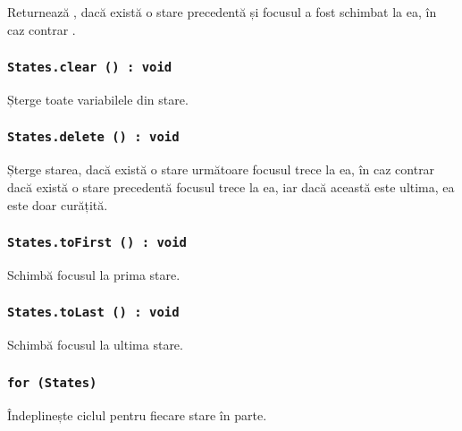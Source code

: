 Returnează \true, dacă există o stare precedentă și focusul a fost schimbat la ea, în caz contrar \false.

\subsubsection{\texttt{States.clear () : void}}

Șterge toate variabilele din stare.

\subsubsection{\texttt{States.delete () : void}}

Șterge starea, dacă există o stare următoare focusul trece la ea, în caz contrar dacă există o stare precedentă focusul trece la ea, iar dacă această este ultima, ea este doar curățită.

\subsubsection{\texttt{States.toFirst () : void}}

Schimbă focusul la prima stare.

\subsubsection{\texttt{States.toLast () : void}}

Schimbă focusul la ultima stare.

\subsubsection{\texttt{for (States) {}}}

Îndeplinește ciclul pentru fiecare stare în parte.

